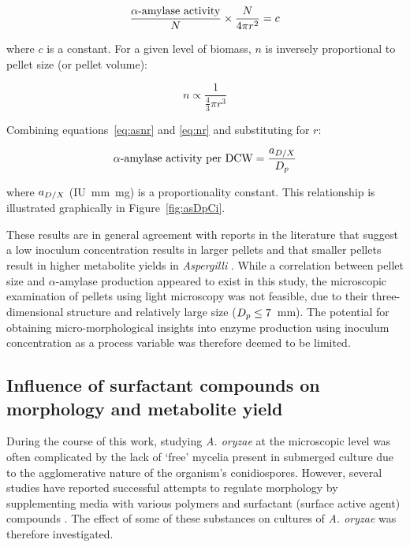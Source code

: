 \begin{equation}\label{eq:aaNA}
	\frac{\hbox{$\alpha$-amylase activity}}{N} \times \frac{N}{4 \pi r^2} = c
\end{equation}

\noindent where $c$ is a constant. For a given level of biomass, $n$ is inversely proportional to pellet size (or pellet volume):

\begin{equation} \label{eq:nr}
	n \propto \frac{1}{\frac{4}{3}\pi r^3} 
\end{equation}

\noindent Combining equations~\ref{eq:asnr} and \ref{eq:nr} and substituting for $r$:

\begin{equation} \label{eq:asDp}
	\hbox{$\alpha$-amylase activity per DCW} = \frac{a_{D/X}}{D_p}
\end{equation}

\noindent where $a_{D/X}$ (IU~mm~mg) is a proportionality constant. This relationship is illustrated graphically in Figure~\ref{fig:asDpCi}.

These results are in general agreement with reports in the literature that suggest a low inoculum concentration results in larger pellets \cite{papagianni2002,papagianni2006a,dobson2008b} and that smaller pellets result in higher metabolite yields in \emph{Aspergilli} \cite{elenshasy2006,couri2003,ali2006,xu2000}. While a correlation between pellet size and $\alpha$-amylase production appeared to exist in this study, the microscopic examination of pellets using light microscopy was not feasible, due to their three-dimensional structure and relatively large size ($D_p \leq 7$~mm). The potential for obtaining micro-morphological insights into enzyme production using inoculum concentration as a process variable was therefore deemed to be limited.

\subsection{Influence of surfactant compounds on morphology and metabolite yield}

During the course of this work, studying \emph{A. oryzae} at the microscopic level was often complicated by the lack of \lq free' mycelia present in submerged culture due to the agglomerative nature of the organism's conidiospores. However, several studies have reported successful attempts to regulate morphology by supplementing media with various polymers and surfactant (surface active agent) compounds \cite{znidarsic2000,domingues2000,dobson2008b,lucatero2004,ilic2008}. The effect of some of these substances on cultures of \emph{A. oryzae} was therefore investigated.


